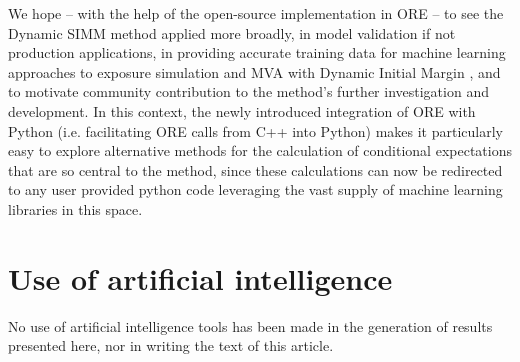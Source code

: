 \documentclass[11pt,a4paper,oneside]{article}
\begin{document}
We hope -- with the help of the open-source implementation in ORE -- to see the Dynamic SIMM method applied more broadly, in model validation if not production
applications, in providing accurate training data for machine learning approaches to exposure simulation and MVA with Dynamic Initial Margin
\cite{aryan_2020,villarino_2024}, and to motivate community contribution to the method's further investigation and development.
In this context, the newly introduced integration of ORE with Python (i.e. facilitating ORE calls from C++ into Python) makes it particularly easy to explore
alternative methods for the calculation of conditional expectations that are so central to the method, since these calculations can now be redirected
to any user provided python code leveraging the vast supply of machine learning libraries in this space.

\section{Use of artificial intelligence}

No use of artificial intelligence tools has been made in the generation of results presented here, nor in writing the text of this article.
\end{document}
